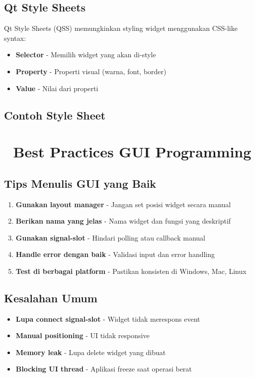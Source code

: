 \subsection{Qt Style Sheets}

Qt Style Sheets (QSS) memungkinkan styling widget menggunakan CSS-like syntax:
\begin{itemize}
\item \textbf{Selector} - Memilih widget yang akan di-style
\item \textbf{Property} - Properti visual (warna, font, border)
\item \textbf{Value} - Nilai dari properti
\end{itemize}

\subsection{Contoh Style Sheet}



\section{🔧 Best Practices GUI Programming}

\subsection{Tips Menulis GUI yang Baik}

\begin{enumerate}
\item \textbf{Gunakan layout manager} - Jangan set posisi widget secara manual
\item \textbf{Berikan nama yang jelas} - Nama widget dan fungsi yang deskriptif
\item \textbf{Gunakan signal-slot} - Hindari polling atau callback manual
\item \textbf{Handle error dengan baik} - Validasi input dan error handling
\item \textbf{Test di berbagai platform} - Pastikan konsisten di Windows, Mac, Linux
\end{enumerate}

\subsection{Kesalahan Umum}

\begin{itemize}
\item \textbf{Lupa connect signal-slot} - Widget tidak merespons event
\item \textbf{Manual positioning} - UI tidak responsive
\item \textbf{Memory leak} - Lupa delete widget yang dibuat
\item \textbf{Blocking UI thread} - Aplikasi freeze saat operasi berat
\end{itemize}

